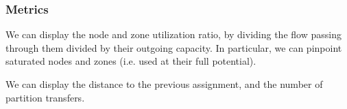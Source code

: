 \documentclass[]{article}
\begin{document}
\subsubsection*{Metrics}
We can display the node and zone utilization ratio, by dividing the flow passing through them divided by their outgoing capacity. In particular, we can pinpoint saturated nodes and zones (i.e. used at their full potential).

We can display the distance to the previous assignment, and the number of partition transfers.


 

\end{document}
